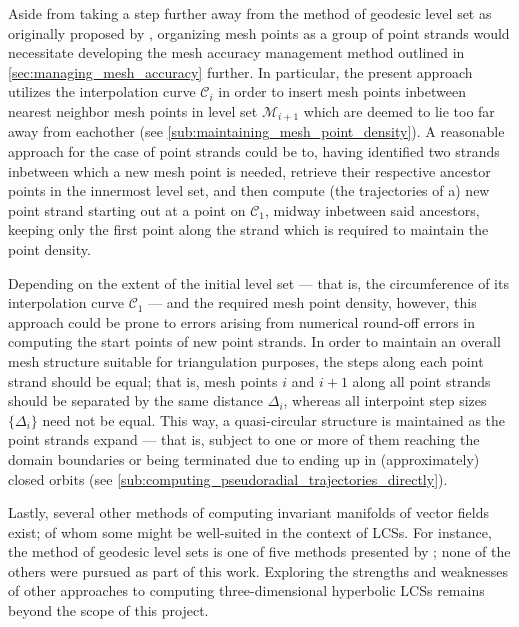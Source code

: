 Aside from taking a step further away from the method of geodesic level set as
originally proposed by \textcite{krauskopf2005survey}, organizing mesh
points as a group of point strands would necessitate developing the mesh
accuracy management method outlined in \cref{sec:managing_mesh_accuracy}
further. In particular, the present approach utilizes the interpolation curve
$\mathcal{C}_{i}$ in order to insert mesh points inbetween nearest neighbor
mesh points in level set $\mathcal{M}_{i+1}$ which are deemed to lie too far
away from eachother (see \cref{sub:maintaining_mesh_point_density}). A
reasonable approach for the case of point strands could be to, having
identified two strands inbetween which a new mesh point is needed, retrieve
their respective ancestor points in the innermost level set, and then compute
(the trajectories of a) new point strand starting out at a point on
$\mathcal{C}_{1}$, midway inbetween said ancestors, keeping only the first
point along the strand which is required to maintain the point density.

Depending on the extent of the initial level set --- that is, the circumference
of its interpolation curve $\mathcal{C}_{1}$ --- and the required mesh point
density, however, this approach could be prone to errors arising from numerical
round-off errors in computing the start points of new point strands. In order
to maintain an overall mesh structure suitable for triangulation purposes, the
steps along each point strand should be equal; that is, mesh points $i$ and
$i+1$ along all point strands should be separated by the same distance
$\Delta_{i}$, whereas all interpoint step sizes $\{\Delta_{i}\}$ need
not be equal. This way, a quasi-circular structure is maintained as the
point strands expand --- that is, subject to one or more of them reaching the
domain boundaries or being terminated due to ending up in (approximately)
closed orbits (see \cref{sub:computing_pseudoradial_trajectories_directly}).

Lastly, several other methods of computing invariant manifolds of vector fields
exist; of whom some might be well-suited in the context of LCSs. For instance,
the method of geodesic level sets is one of five methods presented by
\textcite{krauskopf2005survey}; none of the others were pursued as part of this
work. Exploring the strengths and weaknesses of other
approaches to computing three-dimensional hyperbolic LCSs remains beyond the
scope of this project.
